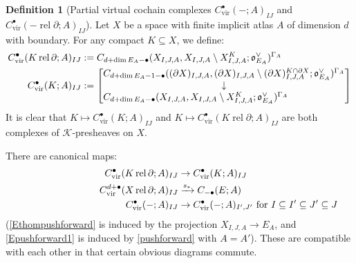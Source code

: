 \documentclass[12pt]{article}
\theoremstyle{definition}
\newtheorem{definition}[theorem]{Definition}
\theoremstyle{remark}
\numberwithin{equation}{subsection}
\newcommand{\K}{\mathcal K}
\newcommand{\oo}{\mathfrak o}
\newcommand{\vir}{\mathrm{vir}}
\newcommand{\rel}{\operatorname{rel}}
\begin{document}
\begin{definition}[Partial virtual cochain complexes $C^\bullet_\vir(-;A)_{IJ}$ and $C^\bullet_\vir(-\rel\partial;A)_{IJ}$]\label{CSTcomplexdef}
Let $X$ be a space with finite implicit atlas $A$ of dimension $d$ with boundary.  For any compact $K\subseteq X$, we define:
\begin{align}
\label{CcomplexcriticaldefI}C^\bullet_\vir(K\rel\partial;A)_{IJ}&:=C_{d+\dim E_A-\bullet}(X_{I,J,A},X_{I,J,A}\setminus X_{I,J,A}^K;\oo_{E_A}^\vee)^{\Gamma_A}\\
\label{CcomplexcriticaldefII}C^\bullet_\vir(K;A)_{IJ}&:=\left[\begin{matrix}C_{d+\dim E_A-1-\bullet}((\partial X)_{I,J,A},(\partial X)_{I,J,A}\setminus(\partial X)_{I,J,A}^{K\cap\partial X};\oo_{E_A}^\vee)^{\Gamma_A}\hfill\cr\downarrow\cr C_{d+\dim E_A-\bullet}(X_{I,J,A},X_{I,J,A}\setminus X_{I,J,A}^K;\oo_{E_A}^\vee)^{\Gamma_A}\hfill\end{matrix}\right]
\end{align}
It is clear that $K\mapsto C^\bullet_\vir(K;A)_{IJ}$ and $K\mapsto C^\bullet_\vir(K\rel\partial;A)_{IJ}$ are both complexes of $\K$-presheaves on $X$.

There are canonical maps:
\begin{align}
\label{Erelpartialpullback}C^\bullet_\vir(K\rel\partial;A)_{IJ}&\to C^\bullet_\vir(K;A)_{IJ}\\
\label{Ethompushforward}C^{d+\bullet}_\vir(X\rel\partial;A)_{IJ}&\xrightarrow{s_\ast}C_{-\bullet}(E;A)\\
\label{Epushforward1}\hspace{1.5in}C^\bullet_\vir(-;A)_{IJ}&\to C^\bullet_\vir(-;A)_{I',J'}\text{ for }I\subseteq I'\subseteq J'\subseteq J
\end{align}
(\eqref{Ethompushforward} is induced by the projection $X_{I,J,A}\to E_A$, and \eqref{Epushforward1} is induced by \eqref{pushforward} with $A=A'$).  These are compatible with each other in that certain obvious diagrams commute.
\end{definition}
\end{document}
